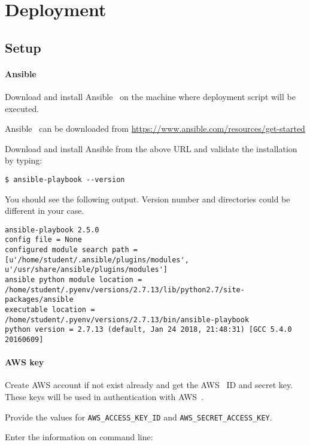 \section{Deployment}

\subsection{Setup}

\paragraph{Ansible}
Download and install Ansible~\cite{hid-sp18-511-www-ansible} on the
machine where deployment script will be executed.

Ansible~\cite{hid-sp18-511-www-ansible} can be downloaded from
\url{https://www.ansible.com/resources/get-started}

Download and install Ansible from the above URL and validate the installation by typing:

\begin{verbatim}
$ ansible-playbook --version
\end{verbatim}

You should see the following output. Version number and directories could be different in your case.

\begin{verbatim}
ansible-playbook 2.5.0
config file = None
configured module search path = [u'/home/student/.ansible/plugins/modules', u'/usr/share/ansible/plugins/modules']
ansible python module location = /home/student/.pyenv/versions/2.7.13/lib/python2.7/site-packages/ansible
executable location = /home/student/.pyenv/versions/2.7.13/bin/ansible-playbook
python version = 2.7.13 (default, Jan 24 2018, 21:48:31) [GCC 5.4.0 20160609]
\end{verbatim}

\paragraph{AWS key}

Create AWS account if not exist already and get the AWS~\cite{hid-sp18-511-www-aws} ID and secret
key. These keys will be used in authentication with AWS~\cite{hid-sp18-511-www-aws}.

Provide the values for \verb|AWS_ACCESS_KEY_ID|
and \verb|AWS_SECRET_ACCESS_KEY|. 

Enter the information on command line:

